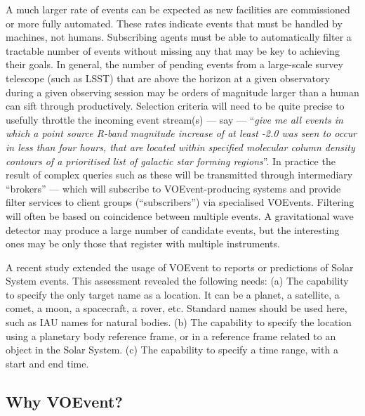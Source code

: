 \documentclass[11pt,a4paper]{ivoa}
\begin{document}
A much larger rate of events can be expected as new facilities are commissioned
or more fully automated. These rates indicate events that must be handled by
machines, not humans. Subscribing agents must be able to automatically filter a
tractable number of events without missing any that may be key to achieving 
their goals. In general, the number of pending events from a large-scale survey 
telescope (such as LSST) that are above the horizon at a given observatory 
during a given observing session may be orders of magnitude larger than a human 
can sift through productively. Selection criteria will need to be quite precise 
to usefully throttle the incoming event stream(s) --- say --- ``\emph{give me 
all events in which a point source R-band magnitude increase of at least -2.0 
was seen to occur in less than four hours, that are located within specified 
molecular column density contours of a prioritised list of galactic star forming
regions}''. In practice the result of complex queries such as these will be
transmitted through intermediary ``brokers'' --- which will subscribe to
VOEvent-producing systems and provide filter services to client groups
(``subscribers'') via specialised VOEvents. Filtering will often be based on
coincidence between multiple events. A gravitational wave detector may produce
a large number of candidate events, but the interesting ones may be only those
that register with multiple instruments.

A recent study \citep{2018arXiv181112680C} extended the usage of VOEvent to
reports or predictions of Solar System events. This assessment revealed the
following needs: (a) The capability to specify the only target name as a
location. It can be a planet, a satellite, a comet, a moon, a spacecraft, a
rover, etc. Standard names should be used here, such as IAU names for natural
bodies. (b) The capability to specify the location using a planetary body
reference frame, or in a reference frame related to an object in the Solar
System. (c) The capability to specify a time range, with a start and end time.

\subsection{Why VOEvent?}
\end{document}
